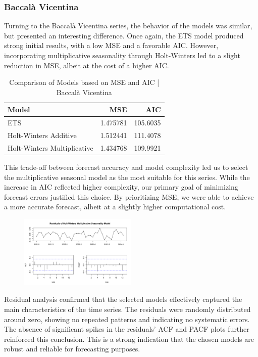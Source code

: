 \documentclass[10pt,twocolumn,letterpaper]{article}
\begin{document}
\subsubsection{Baccalà Vicentina}
Turning to the Baccalà Vicentina series, the behavior of the models was similar, but presented an interesting difference. Once again, the ETS model produced strong initial results, with a low MSE and a favorable AIC. However, incorporating multiplicative seasonality through Holt-Winters led to a slight reduction in MSE, albeit at the cost of a higher AIC.
\begin{table}[H]
\centering
\begin{tabular}{|l|r|r|}
\hline
\textbf{Model} & \textbf{MSE} & \textbf{AIC} \\
\hline
ETS & 1.475781 & 105.6035 \\
Holt-Winters Additive & 1.512441 & 111.4078 \\
Holt-Winters Multiplicative & 1.434768 & 109.9921 \\
\hline
\end{tabular}
\caption{Comparison of Models based on MSE and AIC | Baccalà Vicentina}
\label{table:model_comparison}
\end{table}
This trade-off between forecast accuracy and model complexity led us to select the multiplicative seasonal model as the most suitable for this series. While the increase in AIC reflected higher complexity, our primary goal of minimizing forecast errors justified this choice. By prioritizing MSE, we were able to achieve a more accurate forecast, albeit at a slightly higher computational cost.
\begin{figure}[H]
    \centering
    \includegraphics[width=0.5\textwidth]{PlotsBEFD/Residuals_HWM_V.png} 
    \caption{}
    \label{fig:esempio}
\end{figure}
Residual analysis confirmed that the selected models effectively captured the main characteristics of the time series. The residuals were randomly distributed around zero, showing no repeated patterns and indicating no systematic errors. The absence of significant spikes in the residuals' ACF and PACF plots further reinforced this conclusion. This is a strong indication that the chosen models are robust and reliable for forecasting purposes.
\end{document}
